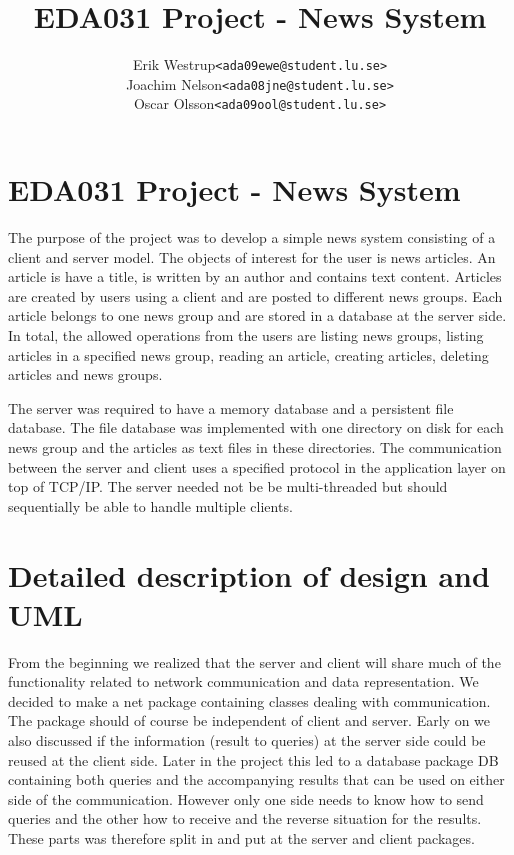 \documentclass[10pt, a4paper]{article}
\title{EDA031 Project - News System}
\author{
	\begin{tabular}{l l}
		Erik Westrup & \texttt{<ada09ewe@student.lu.se>}\\
		Joachim Nelson & \texttt{<ada08jne@student.lu.se>} \\ %
		Oscar Olsson & \texttt{<ada09ool@student.lu.se>}
	\end{tabular}
}
\begin{document}
\begin{titlepage}
\maketitle
\thispagestyle{empty}	%
\end{titlepage}

\section{EDA031 Project - News System}
The purpose of the project was to develop a simple news system consisting of a client and server model. The objects of interest for the user is news articles. An article is have a title, is written by an author and contains text content. Articles are created by users using a client and are posted to different news groups. Each article belongs to one news group and are stored in a database at the server side. In total, the allowed operations from the users are listing news groups, listing articles in a specified news group, reading an article, creating articles, deleting articles and news groups.

The server was required to have a memory database and a persistent file database. The file database was implemented with one directory on disk for each news group and the articles as text files in these directories. The communication between the server and client uses a specified protocol in the application layer on top of TCP/IP. The server needed not be be multi-threaded but should sequentially be able to handle multiple clients.

\section{Detailed description of design and UML}
From the beginning we realized that the server and client will share much of the functionality related to network communication and data representation. We decided to make a net package containing classes dealing with communication. The package should of course be independent of client and server. Early on we also discussed if the information (result to queries)  at the server side could be reused at the client side. Later in the project this led to a database package DB containing both queries and the accompanying results that can be used on either side of the communication. However only one side needs to know how to send queries and the other how to receive and the reverse situation for the results. These parts was therefore split in and put at the server and client packages.
\end{document}
